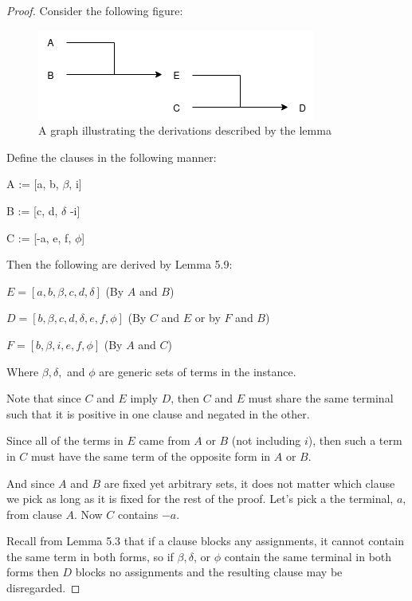 \documentclass[manuscript]{acmart}
\begin{document}
    \begin{proof}
        
        Consider the following figure:
        
        \begin{figure}[h]
            \includegraphics[scale=0.8]{511a}        
            \caption{A graph illustrating the derivations described by the lemma}
            \label{fig:one}
        \end{figure}

        Define the clauses in the following manner:

        A := [a, b, $\beta$, i]

        B := [c, d, $\delta$ -i]

        C := [-a, e, f, $\phi$]

        Then the following are derived by Lemma 5.9:
        
        $E = [a, b, \beta, c, d, \delta]$ (By $A$ and $B$)

        $D = [b, \beta, c, d, \delta, e, f, \phi]$ (By $C$ and $E$ or by $F$ and $B$)

        $F = [b, \beta, i, e, f, \phi]$ (By $A$ and $C$)

        Where $\beta, \delta, $ and $\phi$ are generic sets of terms in the instance.

        Note that since $C$ and $E$ imply $D$, then $C$ and $E$ must share the same terminal such that it is positive in one clause and negated in the other.
        
        Since all of the terms in $E$ came from $A$ or $B$ (not including $i$), then such a term in $C$ must have the same term of the opposite form in $A$ or $B$.
        
        And since $A$ and $B$ are fixed yet arbitrary sets, it does not matter which clause we pick as long as it is fixed for the rest of the proof. Let's pick a the terminal, $a$, from clause $A$. Now $C$ contains $-a$.
 
        Recall from Lemma 5.3 that if a clause blocks any assignments, it cannot contain the same term in both forms, so if $\beta, \delta$, or $\phi$ contain the same terminal in both forms then $D$ blocks no assignments and the resulting clause may be disregarded.


\end{proof}
\end{document}
